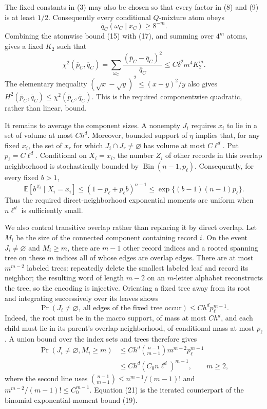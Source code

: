 The fixed constants in (3) may also be chosen so that every factor in (8) and (9) is at least \(1/2\).  Consequently every conditional \(Q\)-mixture atom obeys
\[
 \overline q_C(\omega_C\mid x_C)\ge 8^{-m}.
 \tag{17}
\]
Combining the atomwise bound (15) with (17), and summing over \(4^m\) atoms, gives a fixed \(K_2\) such that
\[
 \chi^2(\overline p_C,\overline q_C)
 =\sum_{\omega_C}\frac{(\overline p_C-\overline q_C)^2}{\overline q_C}
 \le C\delta^2m^4K_2^m.
 \tag{18}
\]
The elementary inequality \((\sqrt{x}-\sqrt{y})^2\le(x-y)^2/y\) also gives \(H^2(\overline p_C,\overline q_C)\le\chi^2(\overline p_C,\overline q_C)\).  This is the required componentwise quadratic, rather than linear, bound.

It remains to average the component sizes.  A nonempty \(J_i\) requires \(x_i\) to lie in a set of volume at most \(Ch^d\).  Moreover, bounded support of \(\eta\) implies that, for any fixed \(x_i\), the set of \(x_r\) for which \(J_i\cap J_r\ne\varnothing\) has volume at most \(C\ell^d\).  Put \(p_\ell=C\ell^d\).  Conditional on \(X_i=x_i\), the number \(Z_i\) of other records in this overlap neighborhood is stochastically bounded by \(\operatorname{Bin}(n-1,p_\ell)\).  Consequently, for every fixed \(b>1\),
\[
 \mathbb E[b^{Z_i}\mid X_i=x_i]
 \le(1-p_\ell+p_\ell b)^{n-1}
 \le\exp\{(b-1)(n-1)p_\ell\}.
 \tag{19}
\]
Thus the required direct-neighborhood exponential moments are uniform when \(n\ell^d\) is sufficiently small.

We also control transitive overlap rather than replacing it by direct overlap.  Let \(M_i\) be the size of the connected component containing record \(i\).  On the event \(J_i\ne\varnothing\) and \(M_i\ge m\), there are \(m-1\) other record indices and a rooted spanning tree on these \(m\) indices all of whose edges are overlap edges.  There are at most \(m^{m-2}\) labeled trees: repeatedly delete the smallest labeled leaf and record its neighbor; the resulting word of length \(m-2\) on an \(m\)-letter alphabet reconstructs the tree, so the encoding is injective.  Orienting a fixed tree away from its root and integrating successively over its leaves shows
\[
 \Pr\!\left(J_i\ne\varnothing,\ \text{all edges of the fixed tree occur}\right)
 \le Ch^d p_\ell^{m-1}.
 \tag{20}
\]
Indeed, the root must be in the macro support, of mass at most \(Ch^d\), and each child must lie in its parent's overlap neighborhood, of conditional mass at most \(p_\ell\).  A union bound over the index sets and trees therefore gives
\[
\begin{split}
 \Pr(J_i\ne\varnothing,M_i\ge m)
 &\le Ch^d\binom{n-1}{m-1}m^{m-2}p_\ell^{m-1}\\
 &\le Ch^d(C_0n\ell^d)^{m-1},\qquad m\ge2,
\end{split}
 \tag{21}
\]
where the second line uses \(\binom{n-1}{m-1}\le n^{m-1}/(m-1)!\) and \(m^{m-2}/(m-1)!\le C_0^{m-1}\).  Equation (21) is the iterated counterpart of the binomial exponential-moment bound (19).

